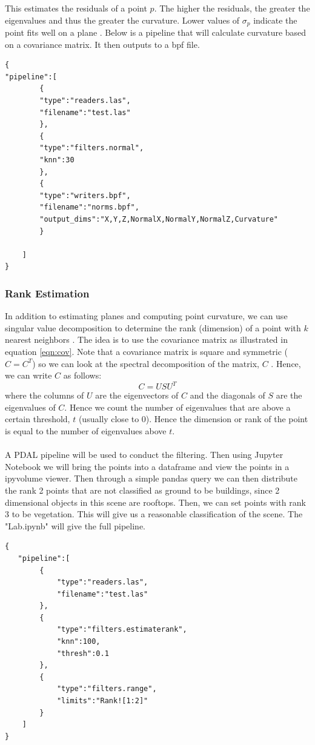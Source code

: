 \documentclass[11pt]{article}
\theoremstyle{definition}
\begin{document}
This estimates the residuals of a point $p$.  The higher the residuals, the greater the eigenvalues and thus the greater the curvature.  Lower values of $\sigma_p$ indicate the point fits well on a plane \cite{RusuDoctoralDissertation}.  Below is a pipeline that will calculate curvature based on a covariance matrix.  It then outputs to a bpf file.  
\begin{lstlisting}[title=Normal Vector and Curvature, label=curv]
{
"pipeline":[
		{
		"type":"readers.las",
		"filename":"test.las"
		},
		{
		"type":"filters.normal",
		"knn":30
		},
		{
		"type":"writers.bpf",
		"filename":"norms.bpf",
		"output_dims":"X,Y,Z,NormalX,NormalY,NormalZ,Curvature"
		}

	]
}
\end{lstlisting}  
\subsubsection{Rank Estimation}\label{subsub:rank}
In addition to estimating planes and computing point curvature, we can use singular value decomposition to determine the rank (dimension) of a point with $k$ nearest neighbors \cite{pdal}.  The idea is to use the covariance matrix as illustrated in equation \ref{eqn:cov}.  Note that a covariance matrix is square and symmetric ($C = C^T$) so we can look at the spectral decomposition of the matrix, $C$ \cite{madsen2004singular}.  Hence, we can write $C$ as follows:
\begin{equation}\label{eqn:rank}
C = USU^T
\end{equation}
where the columns of $U$ are the eigenvectors of $C$ and the diagonals of $S$ are the eigenvalues of $C$.  Hence we count the number of eigenvalues that are above a certain threshold, $t$ (usually close to 0).  Hence the dimension or rank of the point is equal to the number of eigenvalues above $t$.
\\\\
A PDAL pipeline will be used to conduct the filtering.  Then using Jupyter Notebook we will bring the points into a dataframe and view the points in a ipyvolume viewer.  Then through a simple pandas query we can then distribute the rank 2 points that are not classified as ground to be buildings, since 2 dimensional objects in this scene are rooftops.  Then, we can set points with rank 3 to be vegetation.  This will give us a reasonable classification of the scene.  The "Lab.ipynb" will give the full pipeline. 
\begin{lstlisting}[title=Rank estimation pipeline, label=rank]
{
   "pipeline":[
		{
			"type":"readers.las",
			"filename":"test.las"
		}, 
		{
			"type":"filters.estimaterank",
			"knn":100,
			"thresh":0.1
		},
		{
			"type":"filters.range",
			"limits":"Rank![1:2]"
		}
	]
}
\end{lstlisting}
 
\end{document}
